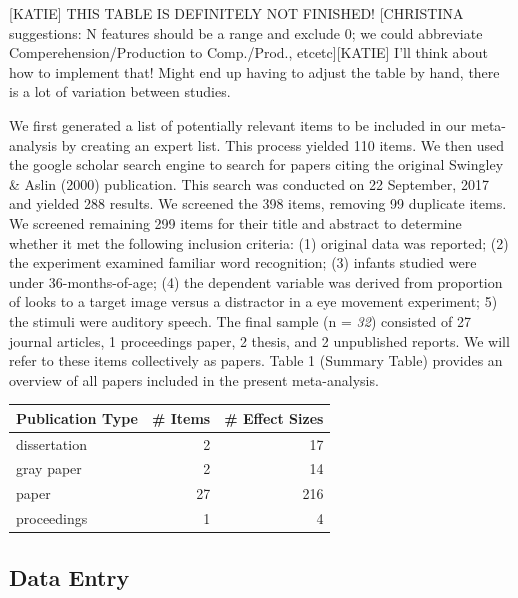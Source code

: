 \documentclass[man]{apa6}
\theoremstyle{definition}
\theoremstyle{definition}
\theoremstyle{definition}
\theoremstyle{remark}
\begin{document}
{[}KATIE{]} THIS TABLE IS DEFINITELY NOT FINISHED! {[}CHRISTINA
suggestions: N features should be a range and exclude 0; we could
abbreviate Comperehension/Production to Comp./Prod.,
etcetc{]}{[}KATIE{]} I'll think about how to implement that! Might end
up having to adjust the table by hand, there is a lot of variation
between studies.

We first generated a list of potentially relevant items to be included
in our meta-analysis by creating an expert list. This process yielded
110 items. We then used the google scholar search engine to search for
papers citing the original Swingley \& Aslin (2000) publication. This
search was conducted on 22 September, 2017 and yielded 288 results. We
screened the 398 items, removing 99 duplicate items. We screened
remaining 299 items for their title and abstract to determine whether it
met the following inclusion criteria: (1) original data was reported;
(2) the experiment examined familiar word recognition; (3) infants
studied were under 36-months-of-age; (4) the dependent variable was
derived from proportion of looks to a target image versus a distractor
in a eye movement experiment; 5) the stimuli were auditory speech. The
final sample (n = \emph{32}) consisted of 27 journal articles, 1
proceedings paper, 2 thesis, and 2 unpublished reports. We will refer to
these items collectively as papers. Table 1 (Summary Table) provides an
overview of all papers included in the present meta-analysis.

\begin{tabular}{l|r|r}
\hline
Publication Type & \# Items & \# Effect Sizes\\
\hline
dissertation & 2 & 17\\
\hline
gray paper & 2 & 14\\
\hline
paper & 27 & 216\\
\hline
proceedings & 1 & 4\\
\hline
\end{tabular}

\subsection{Data Entry}\label{data-entry}
\end{document}
